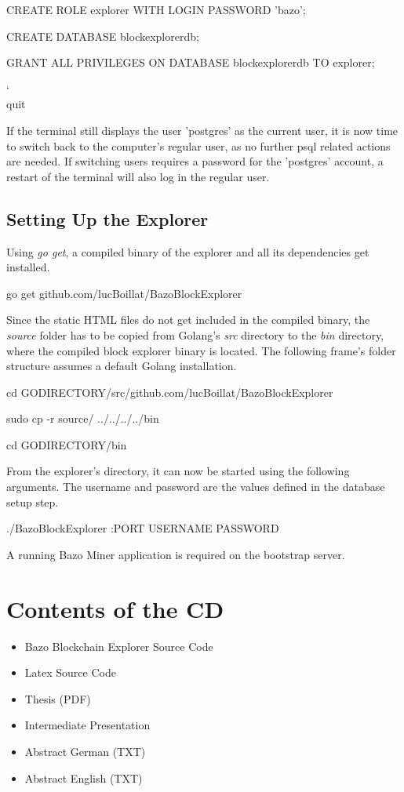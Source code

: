 \begin{framed}
CREATE ROLE explorer WITH LOGIN PASSWORD 'bazo';

CREATE DATABASE blockexplorerdb;

GRANT ALL PRIVILEGES ON DATABASE blockexplorerdb TO explorer;

\char`\\quit
\end{framed}

If the terminal still displays the user 'postgres' as the current user, it is now time to switch back to the computer's regular user, as no further psql related actions are needed. If switching users requires a password for the 'postgres' account, a restart of the terminal will also log in the regular user.

\section{Setting Up the Explorer}

Using \emph{go get}, a compiled binary of the explorer and all its dependencies get installed.

\begin{framed}
go get github.com/lucBoillat/BazoBlockExplorer
\end{framed}

Since the static HTML files do not get included in the compiled binary, the \emph{source} folder has to be copied from Golang's \emph{src} directory to the \emph{bin} directory, where the compiled block explorer binary is located. The following frame's folder structure assumes a default Golang installation.

\begin{framed}
cd GODIRECTORY/src/github.com/lucBoillat/BazoBlockExplorer

sudo cp -r source/ ../../../../bin

cd GODIRECTORY/bin

\end{framed}

From the explorer's directory, it can now be started using the following arguments. The username and password are the values defined in the database setup step.
\begin{framed}
./BazoBlockExplorer :PORT USERNAME PASSWORD
\end{framed}

A running Bazo Miner application is required on the bootstrap server.

\chapter{Contents of the CD}

\begin{itemize}
\item Bazo Blockchain Explorer Source Code
\item Latex Source Code
\item Thesis (PDF)
\item Intermediate Presentation
\item Abstract German (TXT)
\item Abstract English (TXT)
\end{itemize}